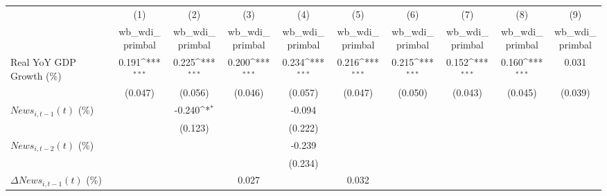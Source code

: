 {
\def\sym#1{\ifmmode^{#1}\else\(^{#1}\)\fi}
\begin{tabular}{l*{9}{c}}
\toprule
                    &\multicolumn{1}{c}{(1)}&\multicolumn{1}{c}{(2)}&\multicolumn{1}{c}{(3)}&\multicolumn{1}{c}{(4)}&\multicolumn{1}{c}{(5)}&\multicolumn{1}{c}{(6)}&\multicolumn{1}{c}{(7)}&\multicolumn{1}{c}{(8)}&\multicolumn{1}{c}{(9)}\\
                    &\multicolumn{1}{c}{wb_wdi_primbal}&\multicolumn{1}{c}{wb_wdi_primbal}&\multicolumn{1}{c}{wb_wdi_primbal}&\multicolumn{1}{c}{wb_wdi_primbal}&\multicolumn{1}{c}{wb_wdi_primbal}&\multicolumn{1}{c}{wb_wdi_primbal}&\multicolumn{1}{c}{wb_wdi_primbal}&\multicolumn{1}{c}{wb_wdi_primbal}&\multicolumn{1}{c}{wb_wdi_primbal}\\
\midrule
Real YoY GDP Growth (\%)&       0.191\sym{***}&       0.225\sym{***}&       0.200\sym{***}&       0.234\sym{***}&       0.216\sym{***}&       0.215\sym{***}&       0.152\sym{***}&       0.160\sym{***}&       0.031         \\
                    &     (0.047)         &     (0.056)         &     (0.046)         &     (0.057)         &     (0.047)         &     (0.050)         &     (0.043)         &     (0.045)         &     (0.039)         \\
\addlinespace
$ News_{i,t-1}(t)$ (\%)&                     &      -0.240\sym{*}  &                     &      -0.094         &                     &                     &                     &                     &                     \\
                    &                     &     (0.123)         &                     &     (0.222)         &                     &                     &                     &                     &                     \\
\addlinespace
$ News_{i,t-2}(t)$ (\%)&                     &                     &                     &      -0.239         &                     &                     &                     &                     &                     \\
                    &                     &                     &                     &     (0.234)         &                     &                     &                     &                     &                     \\
\addlinespace
$ \Delta News_{i,t-1}(t)$ (\%)&                     &                     &       0.027         &                     &       0.032         &                     &                     &                     &                     \\

\end{tabular}}
